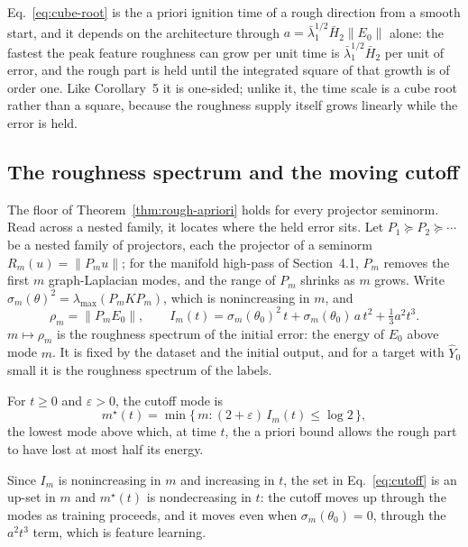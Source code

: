 Eq.~\eqref{eq:cube-root} is the a priori ignition time of a rough direction
from a smooth start, and it depends on the architecture through
$a=\bar\lambda_1^{1/2}\bar H_2\|E_0\|$ alone: the fastest the peak feature
roughness can grow per unit time is $\bar\lambda_1^{1/2}\bar H_2$ per unit
of error, and the rough part is held until the integrated square of that
growth is of order one. Like Corollary~5 it is one-sided; unlike it, the time
scale is a cube root rather than a square, because the roughness supply
itself grows linearly while the error is held.

\subsection{The roughness spectrum and the moving cutoff}

The floor of Theorem~\ref{thm:rough-apriori} holds for every projector
seminorm. Read across a nested family, it locates where the held error sits.
Let $P_1\succeq P_2\succeq\cdots$ be a nested family of projectors, each the
projector of a seminorm $R_m(u)=\|P_mu\|$; for the manifold high-pass of
Section~4.1, $P_m$ removes the first $m$ graph-Laplacian modes, and the range
of $P_m$ shrinks as $m$ grows. Write $\sigma_m(\theta)^2=\lambda_{\max}(P_mKP_m)$,
which is nonincreasing in $m$, and
\begin{equation}
\rho_m = \|P_m E_0\|, \qquad
I_m(t) = \sigma_m(\theta_0)^2\,t+\sigma_m(\theta_0)\,a\,t^2+\tfrac13 a^2t^3 .
\label{eq:rough-spectrum}
\end{equation}
$m\mapsto\rho_m$ is the roughness spectrum of the initial error: the energy
of $E_0$ above mode $m$. It is fixed by the dataset and the initial output,
and for a target with $\hat Y_0$ small it is the roughness spectrum of the
labels.

\begin{definition}
\label{def:cutoff}
For $t\ge0$ and $\varepsilon>0$, the cutoff mode is
\begin{equation}
m^\star(t) = \min\{\,m : (2+\varepsilon)\,I_m(t)\le\log 2\,\},
\label{eq:cutoff}
\end{equation}
the lowest mode above which, at time $t$, the a priori bound allows the rough
part to have lost at most half its energy.
\end{definition}

Since $I_m$ is nonincreasing in $m$ and increasing in $t$, the set in
Eq.~\eqref{eq:cutoff} is an up-set in $m$ and $m^\star(t)$ is nondecreasing
in $t$: the cutoff moves up through the modes as training proceeds, and it
moves even when $\sigma_m(\theta_0)=0$, through the $a^2t^3$ term, which is
feature learning.

